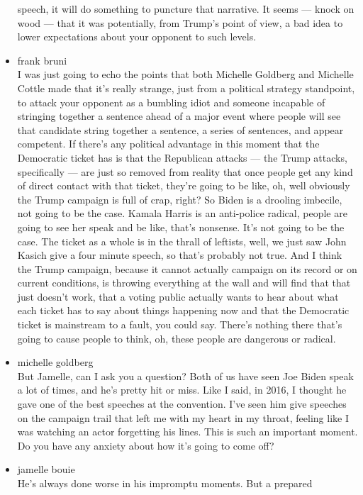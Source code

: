 \begin{itemize}
  speech, it will do something to puncture that narrative. It seems ---
  knock on wood --- that it was potentially, from Trump's point of view,
  a bad idea to lower expectations about your opponent to such levels.
\item
  frank bruni\\
  I was just going to echo the points that both Michelle Goldberg and
  Michelle Cottle made that it's really strange, just from a political
  strategy standpoint, to attack your opponent as a bumbling idiot and
  someone incapable of stringing together a sentence ahead of a major
  event where people will see that candidate string together a sentence,
  a series of sentences, and appear competent. If there's any political
  advantage in this moment that the Democratic ticket has is that the
  Republican attacks --- the Trump attacks, specifically --- are just so
  removed from reality that once people get any kind of direct contact
  with that ticket, they're going to be like, oh, well obviously the
  Trump campaign is full of crap, right? So Biden is a drooling
  imbecile, not going to be the case. Kamala Harris is an anti-police
  radical, people are going to see her speak and be like, that's
  nonsense. It's not going to be the case. The ticket as a whole is in
  the thrall of leftists, well, we just saw John Kasich give a four
  minute speech, so that's probably not true. And I think the Trump
  campaign, because it cannot actually campaign on its record or on
  current conditions, is throwing everything at the wall and will find
  that that just doesn't work, that a voting public actually wants to
  hear about what each ticket has to say about things happening now and
  that the Democratic ticket is mainstream to a fault, you could say.
  There's nothing there that's going to cause people to think, oh, these
  people are dangerous or radical.
\item
  michelle goldberg\\
  But Jamelle, can I ask you a question? Both of us have seen Joe Biden
  speak a lot of times, and he's pretty hit or miss. Like I said, in
  2016, I thought he gave one of the best speeches at the convention.
  I've seen him give speeches on the campaign trail that left me with my
  heart in my throat, feeling like I was watching an actor forgetting
  his lines. This is such an important moment. Do you have any anxiety
  about how it's going to come off?
\item
  jamelle bouie\\
  He's always done worse in his impromptu moments. But a prepared

\end{itemize}
